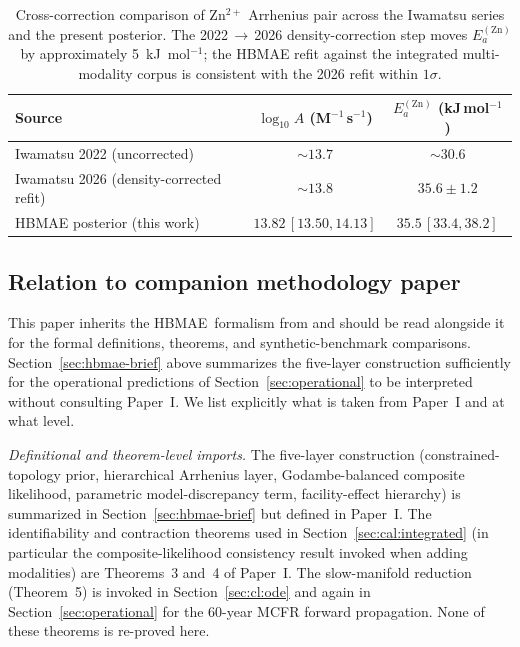 \documentclass[11pt]{article}
\theoremstyle{plain}
\theoremstyle{definition}
\theoremstyle{remark}
\newcommand{\HBMAE}{HBMAE\xspace}
\newcommand{\Ea}{E_a}
\begin{document}
\begin{table}[h!]
\centering
\caption{Cross-correction comparison of Zn$^{2+}$ Arrhenius pair across
the Iwamatsu series and the present posterior.  The 2022\,$\to$\,2026
density-correction step moves $\Ea^{(\mathrm{Zn})}$ by approximately
5~kJ~mol$^{-1}$; the HBMAE refit against the integrated multi-modality
corpus is consistent with the 2026 refit within $1\sigma$.}
\label{tab:density-cmp}
\small
\begin{tabular}{lcc}
\toprule
Source                      & $\log_{10}\!A$ (M$^{-1}$\,s$^{-1}$) & $\Ea^{(\mathrm{Zn})}$ (kJ\,mol$^{-1}$) \\
\midrule
Iwamatsu 2022 (uncorrected) & $\sim 13.7$ & $\sim 30.6$ \\
Iwamatsu 2026 (density-corrected refit) & $\sim 13.8$ & $35.6 \pm 1.2$ \\
HBMAE posterior (this work) & $13.82\,[13.50, 14.13]$ & $35.5\,[33.4, 38.2]$ \\
\bottomrule
\end{tabular}
\end{table}

\subsection{Relation to companion methodology paper}

This paper inherits the \HBMAE\ formalism from \citet{Tanore2026PaperI}
and should be read alongside it for the formal definitions, theorems,
and synthetic-benchmark comparisons.  Section~\ref{sec:hbmae-brief}
above summarizes the five-layer construction sufficiently for the
operational predictions of Section~\ref{sec:operational} to be
interpreted without consulting Paper~I.  We list explicitly what is
taken from Paper~I and at what level.

\emph{Definitional and theorem-level imports.}  The five-layer
construction (constrained-topology prior, hierarchical Arrhenius layer,
Godambe-balanced composite likelihood, parametric model-discrepancy
term, facility-effect hierarchy) is summarized in
Section~\ref{sec:hbmae-brief} but defined in Paper~I.  The
identifiability and contraction theorems used in Section~\ref{sec:cal:integrated}
(in particular the composite-likelihood consistency result invoked when
adding modalities) are Theorems~3 and~4 of Paper~I.  The slow-manifold
reduction (Theorem~5) is invoked in Section~\ref{sec:cl:ode} and again
in Section~\ref{sec:operational} for the 60-year MCFR forward
propagation.  None of these theorems is re-proved here.
\end{document}
